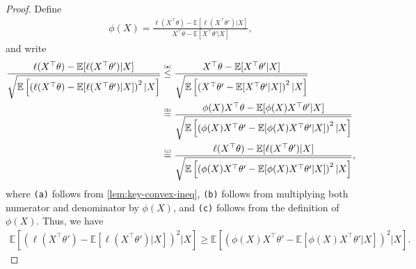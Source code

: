 \documentclass[letter, 12pt]{report}
\newcommand{\explan}[1]{\stackrel{\text{\tiny \texttt{#1}}}}
\newcommand{\E}{\mathbb E}
\newcommand{\I}{\mathcal{I}}
\newcommand{\1}{\mathbf{1}}
\newcommand{\ts}{\textsc{TS}\xspace}
\theoremstyle{plain}
\theoremstyle{definition}
\theoremstyle{remark}
\begin{document}
\begin{proof}
    Define
    \begin{align*}
        \phi(X) = \frac{
            \ell(X^\top \theta) - \E[\ell(X^\top \theta')|X]
        }{
            X^\top \theta - \E[X^\top \theta'|X]
        },
    \end{align*}
    and write
    \begin{align*}
        \frac{
            \ell(X^\top \theta) - \E[\ell(X^\top \theta')|X]
        }{
            \sqrt{
                \E\left[
                    \left(\ell(X^\top \theta) - \E[\ell(X^\top \theta')|X]\right)^2
                    |X
                    \right]
            }
        }
         &
        \explan{(a)}
        \leq
        \frac{
            X^\top \theta - \E[X^\top \theta'|X]
        }{
            \sqrt{
                \E\left[
                    \left(X^\top \theta' - \E[X^\top \theta'|X]\right)^2
                    |X
                    \right]
            }
        }
        \\
         &
        \explan{(b)}
        =
        \frac{
            \phi(X) X^\top \theta - \E[\phi(X)X^\top \theta'|X]
        }{
            \sqrt{
                \E\left[
                    \left(\phi(X) X^\top \theta' - \E[\phi(X)X^\top \theta'|X]\right)^2
                    |X
                    \right]
            }
        }
        \\
         &
        \explan{(c)}
        =
        \frac{
            \ell(X^\top \theta) - \E[\ell(X^\top \theta')|X]
        }{
            \sqrt{
                \E\left[
                    \left(\phi(X) X^\top \theta' - \E[\phi(X)X^\top \theta'|X]\right)^2
                    |X
                    \right]
            }
        },
    \end{align*}
    where \texttt{(a)} follows from \cref{lem:key-convex-ineq},
    \texttt{(b)} follows from multiplying both
    numerator and denominator by $\phi(X)$,
    and \texttt{(c)} follows from the definition of $\phi(X)$.
    Thus, we have
    \begin{align}
        \E\left[
            \left(
            \ell(X^\top \theta') - \E[\ell(X^\top \theta')|X]
            \right)^2
            | X
            \right]
        \geq
        \E\left[
            \left(
            \phi(X) X^\top \theta' - \E[\phi(X)X^\top \theta'|X]
            \right)^2
            | X
            \right].
        \label{ineq:i1}

\end{align}
\end{proof}
\end{document}
